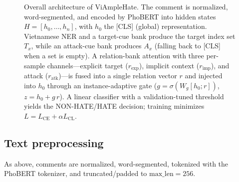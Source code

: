 \documentclass[11pt]{article}
\begin{document}
\begin{figure}[t]
{%
  }
  \caption{Overall architecture of ViAmpleHate. The comment is normalized, word-segmented, and encoded by PhoBERT into hidden states $H=[h_0,\dots,h_n]$, with $h_0$ the [CLS] (global) representation. Vietnamese NER and a target-cue bank produce the target index set $T_x$, while an attack-cue bank produces $A_x$ (falling back to [CLS] when a set is empty). A relation-bank attention with three per-sample channels---explicit target ($r_{\mathrm{exp}}$), implicit context ($r_{\mathrm{imp}}$), and attack ($r_{\mathrm{atk}}$)---is fused into a single relation vector $r$ and injected into $h_0$ through an instance-adaptive gate ($g=\sigma(W_g[h_0;r])$, $z=h_0+g\,r$). A linear classifier with a validation-tuned threshold yields the NON-HATE/HATE decision; training minimizes $L=L_{\mathrm{CE}}+\alpha L_{\mathrm{CL}}$.}
  \label{fig:arch}
\end{figure}

\subsection{Text preprocessing}
As above, comments are normalized, word-segmented, tokenized with the PhoBERT tokenizer, and truncated/padded to $\mathrm{max\_len}=256$.
\end{document}
